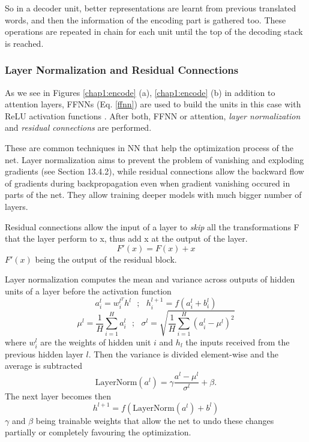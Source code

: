 \documentclass[11pt,english,listoffigures,listoftables]{tfgetsinf}
\begin{document}
So in a decoder unit, better representations are learnt from previous translated words, and then the information of the encoding part is gathered too. These operations are repeated in chain for each unit until the top of the decoding stack is reached.

\subsubsection{Layer Normalization and Residual Connections}
As we see in Figures \ref{chap1:encode} (a), \ref{chap1:encode} (b) in addition to attention layers, FFNNs (Eq. \ref{ffnn}) are used to build the units in this case with ReLU activation functions \cite{https://doi.org/10.48550/arxiv.1803.08375}.
After both, FFNN or attention, \textit{layer normalization} \cite{ARTS:LayNor} and \textit{residual connections} \cite{7780459} are performed.

These are common techniques in NN that help the optimization process of the net. 
Layer normalization aims to prevent the problem of vanishing and exploding gradients (see \cite{pml1Book} Section 13.4.2), while residual connections allow the backward flow of gradients during backpropagation even when gradient vanishing occured in parts of the net. They allow training deeper models with much bigger number of layers.

Residual connections allow the input of a layer to \textit{skip} all the transformations F that the layer perform to x, thus add x at the output of the layer.
\begin{equation}
    F'(x) = F(x) + x
\end{equation}
$F'(x)$ being the output of the residual block.

Layer normalization computes the mean and variance across outputs of hidden units of a layer before the activation function
\begin{equation}
    a_i^l = w_i^{l^T}h^l \ \ \ ; \ \ \ h_i^{l+1} = f(a_i^l + b_i^l)
\end{equation}
\begin{equation}
    \mu^l=\frac{1}{H}\sum_{i=1}^{H}a_i^l \ \ \ ; \ \ \ \sigma^l=\sqrt{\frac{1}{H}\sum_{i=1}^H(a_i^l-\mu^l)^2} 
\end{equation}
where $w_i^l$ are the weights of hidden unit $i$ and $h_l$ the inputs received from the previous hidden layer $l$.
Then the variance is divided element-wise and the average is subtracted
\begin{equation}
    \text{LayerNorm}(a^l) = \gamma \frac{a^l-\mu^l}{\sigma^l} + \beta.
\end{equation}
The next layer becomes then
\begin{equation}
    h^{l+1}=f(\text{LayerNorm}(a^l) + b^l)
\end{equation}
$\gamma$ and $\beta$ being trainable weights that allow the net to undo these changes partially or completely favouring the optimization.
\end{document}
